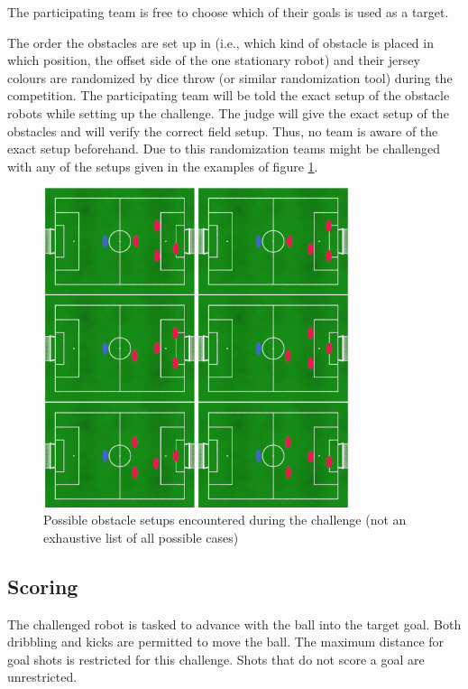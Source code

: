 The participating team is free to choose which of their goals is used as a target.

The order the obstacles are set up in (i.e., which kind of obstacle is placed in which position, the offset side of the one stationary robot) and their jersey colours are randomized by dice throw (or similar randomization tool) during the competition. The participating team will be told the exact setup of the obstacle robots while setting up the challenge. The judge will give the exact setup of the obstacles and will verify the correct field setup. Thus, no team is aware of the exact setup beforehand. Due to this randomization teams might be challenged with any of the setups given in the examples of figure \ref{fig:possible_obstacle_setups}.

\begin{figure}[ht]
    \centering
	\includegraphics[width=0.8\textwidth]{figs/obstacle_challenge_2021_a.jpeg}
	\caption{Possible obstacle setups encountered during the challenge (not an exhaustive list of all possible cases)}
	\label{fig:possible_obstacle_setups}
\end{figure}

\subsection{Scoring}

The challenged robot is tasked to advance with the ball into the target goal. Both dribbling and kicks are permitted to move the ball. The maximum distance for goal shots is restricted for this challenge. Shots that do not score a goal are unrestricted.

